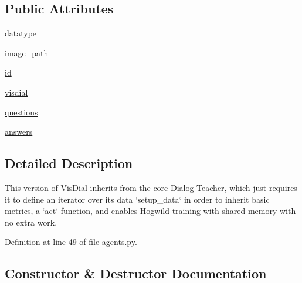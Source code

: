\subsection*{Public Attributes}
\begin{DoxyCompactItemize}
\item 
\hyperlink{classparlai_1_1tasks_1_1visdial_1_1agents_1_1DefaultTeacher_ab0c8e86570399b0ea8f6c96c49dc1b38}{datatype}
\item 
\hyperlink{classparlai_1_1tasks_1_1visdial_1_1agents_1_1DefaultTeacher_a81c9d1779709d5dbf85b927ac4362496}{image\+\_\+path}
\item 
\hyperlink{classparlai_1_1tasks_1_1visdial_1_1agents_1_1DefaultTeacher_af57a8b4ff4119a00559189e2e1fb4ab9}{id}
\item 
\hyperlink{classparlai_1_1tasks_1_1visdial_1_1agents_1_1DefaultTeacher_a8cb96fb50b9c8d040dcb9bd8dd3d1d3e}{visdial}
\item 
\hyperlink{classparlai_1_1tasks_1_1visdial_1_1agents_1_1DefaultTeacher_a4e9d61cd05584be7a63d7407372ce13a}{questions}
\item 
\hyperlink{classparlai_1_1tasks_1_1visdial_1_1agents_1_1DefaultTeacher_a34ad9bd4ee7fcc11445e1df938f0d209}{answers}
\end{DoxyCompactItemize}


\subsection{Detailed Description}
\begin{DoxyVerb}This version of VisDial inherits from the core Dialog Teacher, which just requires
it to define an iterator over its data `setup_data` in order to inherit basic
metrics, a `act` function, and enables Hogwild training with shared memory with no
extra work.
\end{DoxyVerb}
 

Definition at line 49 of file agents.\+py.



\subsection{Constructor \& Destructor Documentation}
\mbox{\label{classparlai_1_1tasks_1_1visdial_1_1agents_1_1DefaultTeacher_ad888b8b7612e78dec919a6769f7e0623}} 
